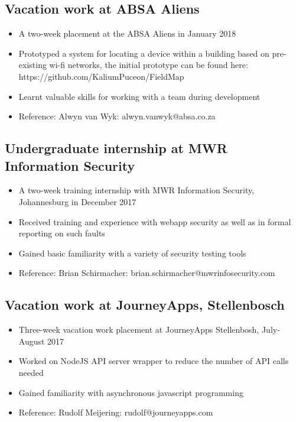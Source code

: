 \documentclass[12pt,a4paper,notitlepage]{article}
\begin{document}
\subsection*{Vacation work at ABSA Aliens}
\begin{itemize}
	\setlength\itemsep{0.02em}
    \item A two-week placement at the ABSA Aliens in January 2018
    \item Prototyped a system for locating a device within a building based on pre-existing wi-fi networks, the initial prototype can be found here:\\https://github.com/KaliumPuceon/FieldMap
    \item Learnt valuable skills for working with a team during development
    \item Reference: Alwyn van Wyk: alwyn.vanwyk@absa.co.za
\end{itemize}

\subsection*{Undergraduate internship at MWR Information Security}
\begin{itemize}
	\setlength\itemsep{0.02em}
    \item A two-week training internship with MWR Information Security, Johannesburg in December 2017
    \item Received training and experience with webapp security as well as in formal reporting on such faults
    \item Gained basic familiarity with a variety of security testing tools
    \item Reference: Brian Schirmacher: brian.schirmacher@mwrinfosecurity.com
\end{itemize}

\subsection*{Vacation work at JourneyApps, Stellenbosch}
\begin{itemize}
	\setlength\itemsep{0.02em}
    \item Three-week vacation work placement at JourneyApps Stellenbosh, July-August 2017
    \item Worked on NodeJS API server wrapper to reduce the number of API calls needed
    \item Gained familiarity with asynchronous javascript programming
    \item Reference: Rudolf Meijering: rudolf@journeyapps.com
\end{itemize}
\end{document}
